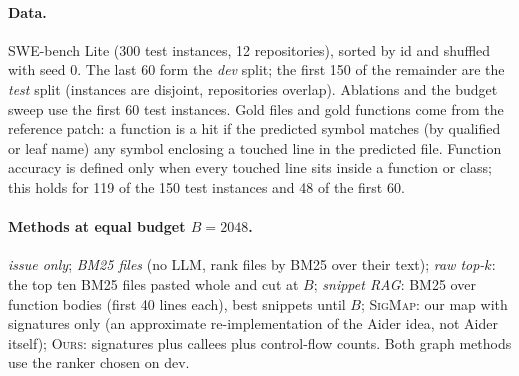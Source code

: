 \documentclass[10pt]{article}
\newcommand{\sig}{\textsc{SigMap}}
\newcommand{\ours}{\textsc{Ours}}
\begin{document}
\paragraph{Data.} SWE-bench Lite \cite{swebench} (300 test instances, 12 repositories), sorted by id and shuffled with seed 0. The last 60 form the \emph{dev} split; the first 150 of the remainder are the \emph{test} split (instances are disjoint, repositories overlap). Ablations and the budget sweep use the first 60 test instances. Gold files and gold functions come from the reference patch: a function is a hit if the predicted symbol matches (by qualified or leaf name) any symbol enclosing a touched line in the predicted file. Function accuracy is defined only when every touched line sits inside a function or class; this holds for 119 of the 150 test instances and 48 of the first 60.

\paragraph{Methods at equal budget $B=2048$.} \emph{issue only}; \emph{BM25 files} (no LLM, rank files by BM25 over their text); \emph{raw top-$k$}: the top ten BM25 files pasted whole and cut at $B$; \emph{snippet RAG}: BM25 over function bodies (first 40 lines each), best snippets until $B$; \sig: our map with signatures only (an approximate re-implementation of the Aider idea, not Aider itself); \ours: signatures plus callees plus control-flow counts. Both graph methods use the ranker chosen on dev.
\end{document}
